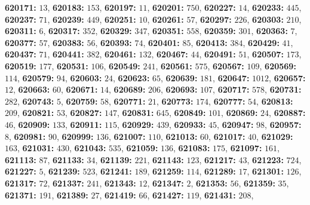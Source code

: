 \textsf{\bfseries 620171:} $13$, \textsf{\bfseries 620183:} $153$, \textsf{\bfseries 620197:} $11$, \textsf{\bfseries 620201:} $750$, \textsf{\bfseries 620227:} $14$, \textsf{\bfseries 620233:} $445$, \textsf{\bfseries 620237:} $71$, \textsf{\bfseries 620239:} $449$, \textsf{\bfseries 620251:} $10$, \textsf{\bfseries 620261:} $57$, \textsf{\bfseries 620297:} $226$, \textsf{\bfseries 620303:} $210$, \textsf{\bfseries 620311:} $6$, \textsf{\bfseries 620317:} $352$, \textsf{\bfseries 620329:} $347$, \textsf{\bfseries 620351:} $558$, \textsf{\bfseries 620359:} $301$, \textsf{\bfseries 620363:} $7$, \textsf{\bfseries 620377:} $57$, \textsf{\bfseries 620383:} $56$, \textsf{\bfseries 620393:} $74$, \textsf{\bfseries 620401:} $85$, \textsf{\bfseries 620413:} $384$, \textsf{\bfseries 620429:} $41$, \textsf{\bfseries 620437:} $71$, \textsf{\bfseries 620441:} $382$, \textsf{\bfseries 620461:} $132$, \textsf{\bfseries 620467:} $44$, \textsf{\bfseries 620491:} $51$, \textsf{\bfseries 620507:} $173$, \textsf{\bfseries 620519:} $177$, \textsf{\bfseries 620531:} $106$, \textsf{\bfseries 620549:} $241$, \textsf{\bfseries 620561:} $575$, \textsf{\bfseries 620567:} $109$, \textsf{\bfseries 620569:} $114$, \textsf{\bfseries 620579:} $94$, \textsf{\bfseries 620603:} $24$, \textsf{\bfseries 620623:} $65$, \textsf{\bfseries 620639:} $181$, \textsf{\bfseries 620647:} $1012$, \textsf{\bfseries 620657:} $12$, \textsf{\bfseries 620663:} $60$, \textsf{\bfseries 620671:} $14$, \textsf{\bfseries 620689:} $206$, \textsf{\bfseries 620693:} $107$, \textsf{\bfseries 620717:} $578$, \textsf{\bfseries 620731:} $282$, \textsf{\bfseries 620743:} $5$, \textsf{\bfseries 620759:} $58$, \textsf{\bfseries 620771:} $21$, \textsf{\bfseries 620773:} $174$, \textsf{\bfseries 620777:} $54$, \textsf{\bfseries 620813:} $209$, \textsf{\bfseries 620821:} $53$, \textsf{\bfseries 620827:} $147$, \textsf{\bfseries 620831:} $645$, \textsf{\bfseries 620849:} $101$, \textsf{\bfseries 620869:} $24$, \textsf{\bfseries 620887:} $46$, \textsf{\bfseries 620909:} $133$, \textsf{\bfseries 620911:} $115$, \textsf{\bfseries 620929:} $439$, \textsf{\bfseries 620933:} $45$, \textsf{\bfseries 620947:} $98$, \textsf{\bfseries 620957:} $8$, \textsf{\bfseries 620981:} $90$, \textsf{\bfseries 620999:} $136$, \textsf{\bfseries 621007:} $110$, \textsf{\bfseries 621013:} $60$, \textsf{\bfseries 621017:} $40$, \textsf{\bfseries 621029:} $163$, \textsf{\bfseries 621031:} $430$, \textsf{\bfseries 621043:} $535$, \textsf{\bfseries 621059:} $136$, \textsf{\bfseries 621083:} $175$, \textsf{\bfseries 621097:} $161$, \textsf{\bfseries 621113:} $87$, \textsf{\bfseries 621133:} $34$, \textsf{\bfseries 621139:} $221$, \textsf{\bfseries 621143:} $123$, \textsf{\bfseries 621217:} $43$, \textsf{\bfseries 621223:} $724$, \textsf{\bfseries 621227:} $5$, \textsf{\bfseries 621239:} $523$, \textsf{\bfseries 621241:} $189$, \textsf{\bfseries 621259:} $114$, \textsf{\bfseries 621289:} $17$, \textsf{\bfseries 621301:} $126$, \textsf{\bfseries 621317:} $72$, \textsf{\bfseries 621337:} $241$, \textsf{\bfseries 621343:} $12$, \textsf{\bfseries 621347:} $2$, \textsf{\bfseries 621353:} $56$, \textsf{\bfseries 621359:} $35$, \textsf{\bfseries 621371:} $191$, \textsf{\bfseries 621389:} $27$, \textsf{\bfseries 621419:} $66$, \textsf{\bfseries 621427:} $119$, \textsf{\bfseries 621431:} $208$, 

